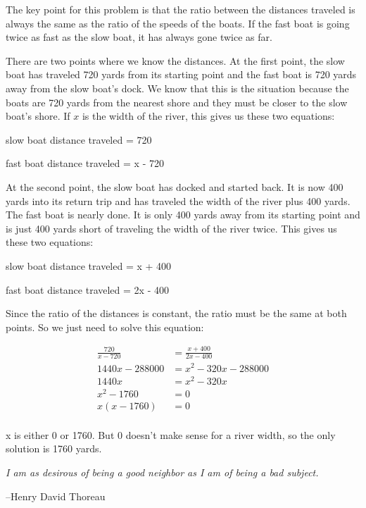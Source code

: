 \documentclass[fleqn,addpoints]{exam}
\begin{document}
\begin{solution}[4 in]
The key point for this problem is that the ratio between the distances traveled is always the same as the ratio of the
speeds of the boats.  If the fast boat is going twice as fast as the slow boat, it has always gone twice as far. 

There are two points where we know the distances.  At the first point, the slow boat has traveled 720 yards from its
starting point and the fast boat is 720 yards away from the slow boat's dock.  We know that this is the situation
because the boats are 720 yards from the nearest shore and they must be closer to the slow boat's shore.  If $x$ is the
width of the river, this gives us these two equations:
\begin{itemize*}
  \item slow boat distance traveled = 720
  \item fast boat distance traveled = x - 720
\end{itemize*}

At the second point, the slow boat has docked and started back.  It is now 400 yards into its return trip and has
traveled the width of the river plus 400 yards.  The fast
boat is nearly done.  It is only 400 yards away from its starting point and is just 400 yards short of traveling the
width of the river twice.  This gives us these two equations:
\begin{itemize*}
  \item slow boat distance traveled = x + 400
  \item fast boat distance traveled = 2x - 400
\end{itemize*}

Since the ratio of the distances is constant, the ratio must be the same at both points.  So we just need to solve this
equation:

\begin{align*}
  \frac{720}{x-720} &= \frac{x+400}{2x-400} \\
  1440x - 288000 &= x^2 -320x - 288000 \\
  1440x &= x^2 -320x \\
  x^2 - 1760 &= 0 \\
  x(x-1760) &= 0 \\
\end{align*}

x is either 0 or 1760.  But 0 doesn't make sense for a river width, so the only solution is 1760 yards.

\end{solution}

\ifprintanswers
\else
{\em I am as desirous of being a good neighbor as I am of being a bad subject.}

\vspace{.1 cm}
\hspace{1 cm} --Henry David Thoreau

\fi
\end{document}

